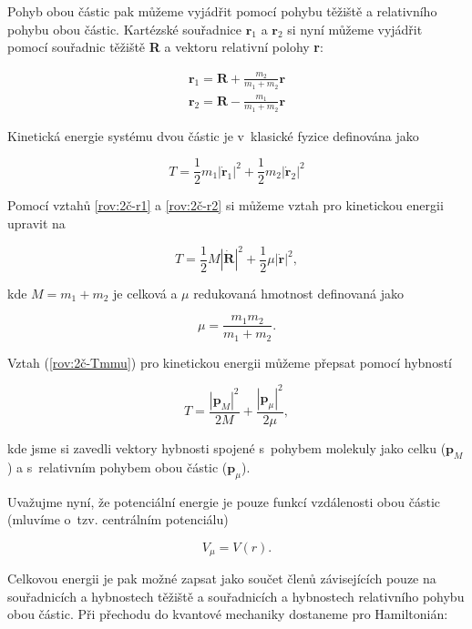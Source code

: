 Pohyb obou částic pak můžeme vyjádřit pomocí pohybu těžiště a relativního pohybu obou částic. Kartézské souřadnice $\textbf{r}_{1}$ a $\textbf{r}_{2}$ si nyní můžeme vyjádřit pomocí souřadnic těžiště \textbf{R} a vektoru relativní polohy \textbf{r}:

\begin{eqnarray}
\textbf{r}_{1}=\textbf{R}+\frac{m_{2}}{m_{1}+m_{2}}\textbf{r}
\label{rov:2č-r1}\\
\textbf{r}_{2}=\textbf{R}-\frac{m_{1}}{m_{1}+m_{2}}\textbf{r}
\label{rov:2č-r2}
\end{eqnarray}

Kinetická energie systému dvou částic je v~klasické fyzice definována jako

\begin{equation}
T=\frac{1}{2}m_{1}|\dot{\textbf{r}}_{1}|^{2}+\frac{1}{2}m_{2}|\dot{\textbf{r}}_{2}|^{2}
\end{equation}

Pomocí vztahů \ref{rov:2č-r1} a \ref{rov:2č-r2} si můžeme vztah pro kinetickou energii upravit na 

\begin{equation}
T=\frac{1}{2}M|\dot{\textbf{R}}|^{2}+\frac{1}{2}\mu| \dot{\textbf{r}}|^{2},
\label{rov:2č-Tmmu}
\end{equation}

kde $ M=m_{1}+m_{2} $ je celková a $ \mu $ redukovaná hmotnost definovaná jako

\begin{equation}
\mu=\frac{m_{1}m_{2}}{m_{1}+m_{2}}.
\end{equation}

Vztah (\ref{rov:2č-Tmmu}) pro kinetickou energii můžeme přepsat pomocí hybností

 \begin{equation}
T=\frac{|\textbf{p}_{M}|^{2}}{2M}+\frac{|\textbf{p}_{\mu}|^{2}}{2\mu},
\label{rov:2č-Thybnosti}
\end{equation}

kde jsme si zavedli vektory hybnosti spojené s~pohybem molekuly jako celku ($ \textbf{p}_{M} $) a s~relativním pohybem obou částic ($ \textbf{p}_{\mu} $). 

Uvažujme nyní, že potenciální energie je pouze funkcí vzdálenosti obou částic (mluvíme o~tzv. centrálním potenciálu)

\begin{equation}
V_{\mu}=V(r).
\end{equation}

Celkovou energii je pak možné zapsat jako součet členů závisejících pouze na souřadnicích a hybnostech těžiště a souřadnicích a hybnostech relativního pohybu obou částic. Při přechodu do kvantové mechaniky dostaneme pro Hamiltonián:


